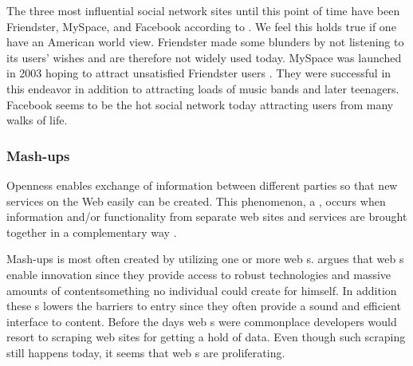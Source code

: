 The three most influential social network sites until this point of time
have been Friendster,%
MySpace,%
and Facebook%
according to \citet{boyd07}. We feel this holds true if
one have an American world view.%
Friendster made some blunders by not listening to its users'
wishes and are therefore not widely used today. MySpace was launched in
2003 hoping to attract unsatisfied Friendster users \citep{boyd07}.
They were successful in this endeavor in addition to attracting loads of
music bands and later teenagers.
Facebook seems to be the hot social network today%
attracting users from many walks of life.

\subsubsection{Mash-ups}
Openness enables exchange of information between
different parties so that new services on the Web easily can be created.
This phenomenon, a ,%
occurs when information and/or functionality from separate web sites and
services are brought together in a complementary way
\citep[]{murugesan07}.

Mash-ups is most often created by utilizing one or more web s.%
\citet[]{floyd07} argues that web s enable innovation since
they provide access to robust technologies and massive amounts of
content\dash{}something no individual could create for himself. In addition
these s lowers the barriers to entry since they often provide a
sound and efficient interface to content. Before the days web s were
commonplace developers would resort to scraping web sites for getting a hold
of data. Even though such scraping still happens today, it seems that web
s are proliferating.


